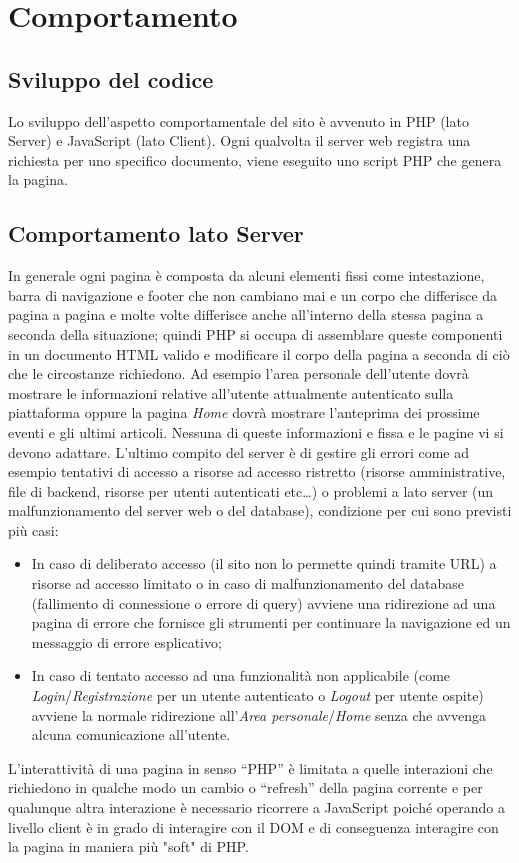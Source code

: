 \section{Comportamento}
\label{Comportamento}
    \subsection{Sviluppo del codice}
    Lo sviluppo dell’aspetto comportamentale del sito è avvenuto in PHP (lato Server) e JavaScript (lato Client).
    Ogni qualvolta il server web registra una richiesta per uno specifico documento, viene eseguito uno script PHP che genera la pagina.
    \subsection{Comportamento lato Server}
    In generale ogni pagina è composta da alcuni elementi fissi come intestazione, barra di navigazione e footer che non cambiano mai e un corpo che differisce da pagina a pagina e molte volte differisce anche all’interno della stessa pagina a seconda della situazione; quindi PHP si occupa di assemblare queste componenti in un documento HTML valido e modificare il corpo della pagina a seconda di ciò che le circostanze richiedono.
    Ad esempio l’area personale dell’utente dovrà mostrare le informazioni relative all’utente attualmente autenticato sulla piattaforma oppure la pagina \textit{Home} dovrà mostrare l’anteprima dei prossime eventi e gli ultimi articoli. Nessuna di queste informazioni e fissa e le pagine vi si devono adattare.
    L’ultimo compito del server è di gestire gli errori come ad esempio tentativi di accesso a risorse ad accesso ristretto (risorse amministrative, file di backend, risorse per utenti autenticati etc…) o problemi a lato server (un malfunzionamento del server web o del database), condizione per cui sono previsti più casi:
    \begin{itemize}
        \item In caso di deliberato accesso (il sito non lo permette quindi tramite URL) a risorse ad accesso limitato o in caso di malfunzionamento del database (fallimento di connessione o errore di query) avviene una ridirezione ad una pagina di errore che fornisce gli strumenti per continuare la navigazione ed un messaggio di errore esplicativo;
        \item In caso di tentato accesso ad una funzionalità non applicabile (come \textit{Login}/\textit{Registrazione} per un utente autenticato o \textit{Logout} per utente ospite) avviene la normale ridirezione all’\textit{Area personale}/\textit{Home} senza che avvenga alcuna comunicazione all’utente.
    \end{itemize}
    L’interattività di una pagina in senso “PHP” è limitata a quelle interazioni che richiedono in qualche modo un cambio o “refresh” della pagina corrente e per qualunque altra interazione è necessario ricorrere a JavaScript poiché operando a livello client è in grado di interagire con il DOM e di conseguenza interagire con la pagina in maniera più "soft" di PHP.
